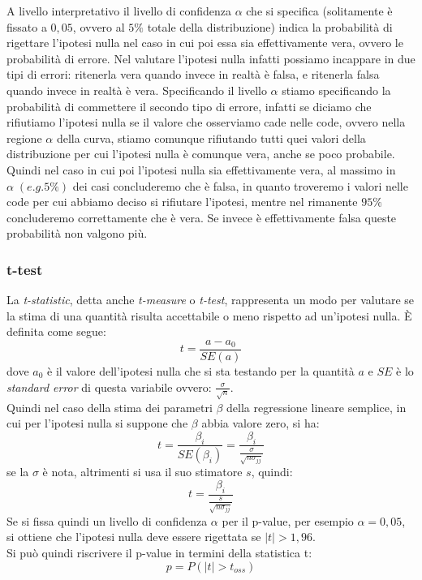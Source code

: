 \documentclass[]{article}
\begin{document}
\begin{tcolorbox}[colback=cyan!5!white, colframe=cyan!75!black, title = Il livello di confidenza $\alpha$]
A livello interpretativo il livello di confidenza $\alpha$ che si specifica (solitamente è fissato a $0,05$, ovvero al $5\%$ totale della distribuzione) indica la probabilità di rigettare l'ipotesi nulla nel caso in cui poi essa sia effettivamente vera, ovvero le probabilità di errore. Nel valutare l'ipotesi nulla infatti possiamo incappare in due tipi di errori: ritenerla vera quando invece in realtà è falsa, e ritenerla falsa quando invece in realtà è vera. Specificando il livello $\alpha$ stiamo specificando la probabilità di commettere il secondo tipo di errore, infatti se diciamo che rifiutiamo l'ipotesi nulla se il valore che osserviamo cade nelle code, ovvero nella regione $\alpha$ della curva, stiamo comunque rifiutando tutti quei valori della distribuzione per cui l'ipotesi nulla è comunque vera, anche se poco probabile. Quindi nel caso in cui poi l'ipotesi nulla sia effettivamente vera, al massimo in $\alpha \; ( e.g.\!5\%)$ dei casi concluderemo che è falsa, in quanto troveremo i valori nelle code per cui abbiamo deciso si rifiutare l'ipotesi, mentre nel rimanente $95\%$ concluderemo correttamente che è vera. Se invece è effettivamente falsa queste probabilità non valgono più.
\end{tcolorbox}

\subsubsection{t-test}

La \textit{t-statistic}, detta anche \textit{t-measure} o \textit{t-test}, rappresenta un modo per valutare se la stima di una quantità risulta accettabile o meno rispetto ad un'ipotesi nulla. È definita come segue:
\begin{equation}
t = \frac{a - a_0}{SE(a)}
\end{equation}
dove $a_0$ è il valore dell'ipotesi nulla che si sta testando per la quantità $a$ e $SE$  è lo \textit{standard error} di questa variabile ovvero: $\frac{\sigma}{\sqrt{n}}$.\\
Quindi nel caso della stima dei parametri $\beta$ della regressione lineare semplice, in cui per l'ipotesi nulla si suppone che $\beta$ abbia valore zero,  si ha:
\begin{equation}
t = \frac{\beta_i}{SE(\beta_i)} = \frac{\beta_i}{\frac{\sigma}{\sqrt{n \sigma_{jj}}}}
\end{equation}
se la $\sigma$ è nota, altrimenti si usa il suo stimatore $s$, quindi:
\begin{equation}
t = \frac{\beta_i}{\frac{s}{\sqrt{n \sigma_{jj}}}}
\end{equation}
Se si fissa quindi un livello di confidenza $\alpha$ per il p-value,  per esempio $\alpha = 0,05$, si ottiene che l'ipotesi nulla deve essere rigettata se $\vert t \vert > 1,96$. \\
Si può quindi riscrivere il p-value in termini della statistica t:
\begin{equation}
p = P(\vert t \vert > t_{oss})
\end{equation}
\end{document}
